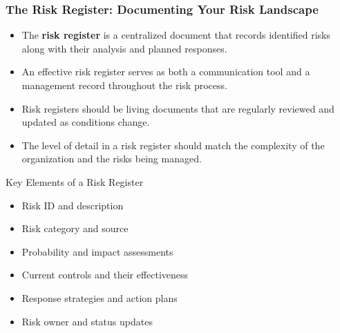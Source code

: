 \documentclass{beamer}
\begin{document}
      \begin{frame}
      \frametitle{The Risk Register: Documenting Your Risk Landscape}
      \begin{itemize}
        \item The \textbf{risk register} is a centralized document that records identified risks along with their analysis and planned responses.
        \item An effective risk register serves as both a communication tool and a management record throughout the risk process.
        \item Risk registers should be living documents that are regularly reviewed and updated as conditions change.
        \item The level of detail in a risk register should match the complexity of the organization and the risks being managed.
      \end{itemize}
      
      \begin{exampleblock}{Key Elements of a Risk Register}
      \begin{itemize}
        \item Risk ID and description
        \item Risk category and source
        \item Probability and impact assessments
        \item Current controls and their effectiveness
        \item Response strategies and action plans
        \item Risk owner and status updates
      \end{itemize}
      \end{exampleblock}
      \end{frame}
      
\end{document}

